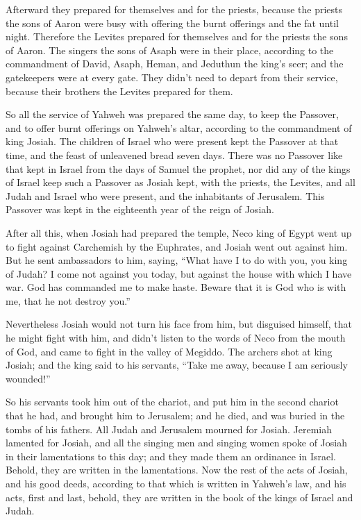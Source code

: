 {Afterward they prepared for themselves and for the priests, because the priests the sons of Aaron were busy with offering the burnt offerings and the fat until night. Therefore the Levites prepared for themselves and for the priests the sons of Aaron.
The singers the sons of Asaph were in their place, according to the commandment of David, Asaph, Heman, and Jeduthun the king’s seer; and the gatekeepers were at every gate. They didn’t need to depart from their service, because their brothers the Levites prepared for them.
\par }{\PP {}So all the service of Yahweh was prepared the same day, to keep the Passover, and to offer burnt offerings on Yahweh’s altar, according to the commandment of king Josiah.
The children of Israel who were present kept the Passover at that time, and the feast of unleavened bread seven days.
There was no Passover like that kept in Israel from the days of Samuel the prophet, nor did any of the kings of Israel keep such a Passover as Josiah kept, with the priests, the Levites, and all Judah and Israel who were present, and the inhabitants of Jerusalem.
This Passover was kept in the eighteenth year of the reign of Josiah.
\par }{\PP {}After all this, when Josiah had prepared the temple, Neco king of Egypt went up to fight against Carchemish by the Euphrates, and Josiah went out against him.
But he sent ambassadors to him, saying, “What have I to do with you, you king of Judah? I come not against you today, but against the house with which I have war. God has commanded me to make haste. Beware that it is God who is with me, that he not destroy you.”
\par }{\PP {}Nevertheless Josiah would not turn his face from him, but disguised himself, that he might fight with him, and didn’t listen to the words of Neco from the mouth of God, and came to fight in the valley of Megiddo.
The archers shot at king Josiah; and the king said to his servants, “Take me away, because I am seriously wounded!”
\par }{\PP {}So his servants took him out of the chariot, and put him in the second chariot that he had, and brought him to Jerusalem; and he died, and was buried in the tombs of his fathers. All Judah and Jerusalem mourned for Josiah.
Jeremiah lamented for Josiah, and all the singing men and singing women spoke of Josiah in their lamentations to this day; and they made them an ordinance in Israel. Behold, they are written in the lamentations.
Now the rest of the acts of Josiah, and his good deeds, according to that which is written in Yahweh’s law,
and his acts, first and last, behold, they are written in the book of the kings of Israel and Judah.

}
